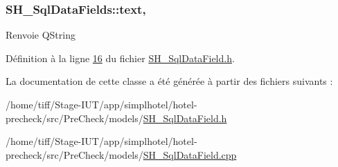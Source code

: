 \hypertarget{classSH__SqlDataFields_aaffdb7a0a20775a3ea44a4c3eb5dc23d}{
\subsubsection[{text}]{\setlength{\rightskip}{0pt plus 5cm}S\-H\-\_\-\-Sql\-Data\-Fields\-::text\hspace{0.3cm}{\ttfamily [read]}, {\ttfamily [write]}}}\label{classSH__SqlDataFields_aaffdb7a0a20775a3ea44a4c3eb5dc23d}
\begin{DoxyReturn}{Renvoie}
Q\-String 
\end{DoxyReturn}


Définition à la ligne \hyperlink{SH__SqlDataField_8h_source_l00016}{16} du fichier \hyperlink{SH__SqlDataField_8h_source}{S\-H\-\_\-\-Sql\-Data\-Field.\-h}.



La documentation de cette classe a été générée à partir des fichiers suivants \-:\begin{DoxyCompactItemize}
\item 
/home/tiff/\-Stage-\/\-I\-U\-T/app/simplhotel/hotel-\/precheck/src/\-Pre\-Check/models/\hyperlink{SH__SqlDataField_8h}{S\-H\-\_\-\-Sql\-Data\-Field.\-h}\item 
/home/tiff/\-Stage-\/\-I\-U\-T/app/simplhotel/hotel-\/precheck/src/\-Pre\-Check/models/\hyperlink{SH__SqlDataField_8cpp}{S\-H\-\_\-\-Sql\-Data\-Field.\-cpp}\end{DoxyCompactItemize}
